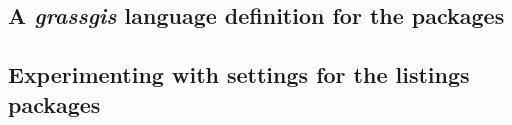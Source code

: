 
\subsection{A \emph{grassgis} language definition for the \protect{}
packages}






\subsection{Experimenting with settings for the listings packages}


